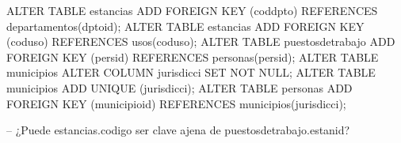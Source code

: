 \lstset{caption=Añadir claves ajenas,label=sql:crearForeignKey}
\begin{SQL}
ALTER TABLE estancias 
ADD FOREIGN KEY (coddpto) REFERENCES departamentos(dptoid);
ALTER TABLE estancias 
ADD FOREIGN KEY (coduso) REFERENCES usos(coduso);
ALTER TABLE puestosdetrabajo 
ADD FOREIGN KEY (persid) REFERENCES personas(persid);
ALTER TABLE municipios
   ALTER COLUMN jurisdicci SET NOT NULL;
ALTER TABLE municipios
  ADD UNIQUE (jurisdicci);
ALTER TABLE personas 
ADD FOREIGN KEY (municipioid) REFERENCES municipios(jurisdicci);

-- ¿Puede estancias.codigo ser clave ajena de puestosdetrabajo.estanid?
\end{SQL}
